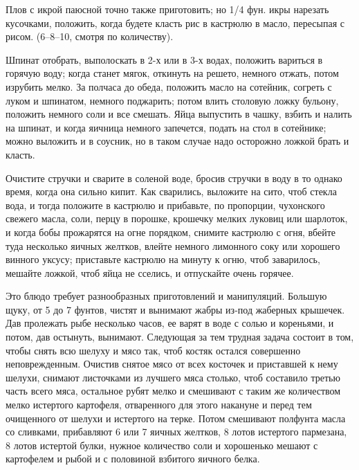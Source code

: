 Плов с икрой паюсной точно также приготовить; но 1/4 фун. икры нарезать кусочками, положить, когда будете класть рис в кастрюлю в масло, пересыпая с рисом. (6--8--10, смотря по количеству). 


Шпинат отобрать, выполоскать в 2-х или в 3-х водах, положить вариться в горячую воду; когда станет мягок, откинуть на решето, немного отжать, потом изрубить мелко. За полчаса до обеда, положить масло на сотейник, согреть с луком и шпинатом, немного поджарить; потом влить столовую ложку бульону, положить немного соли и все смешать. Яйца выпустить в чашку, взбить и налить на шпинат, и когда яичница немного запечется, подать на стол в сотейнике; можно выложить и в соусник, но в таком случае надо осторожно ложкой брать и класть. 


Очистите стручки и сварите в соленой воде, бросив стручки в воду в то однако время, когда она сильно кипит. Как сварились, выложите на сито, чтоб стекла вода, и тогда положите в кастрюлю и прибавьте, по пропорции, чухонского свежего масла, соли, перцу в порошке, крошечку мелких луковиц или шарлоток, и когда бобы прожарятся на огне порядком, снимите кастрюлю с огня, вбейте туда несколько яичных желтков, влейте немного лимонного соку или хорошего винного уксусу; приставьте кастрюлю на минуту к огню, чтоб заварилось, мешайте ложкой, чтоб яйца не сселись, и отпускайте очень горячее. 


Это блюдо требует разнообразных приготовлений и манипуляций. Большую щуку, от 5 до 7 фунтов, чистят и вынимают жабры из-под жаберных крышечек. Дав пролежать рыбе несколько часов, ее варят в воде с солью и кореньями, и потом, дав остынуть, вынимают. Следующая за тем трудная задача состоит в том, чтобы снять всю шелуху и мясо так, чтоб костяк остался совершенно неповрежденным. Очистив снятое мясо от всех косточек и приставшей к нему шелухи, снимают листочками из лучшего мяса столько, чтоб составило третью часть всего мяса, остальное рубят мелко и смешивают с таким же количеством мелко истертого картофеля, отваренного для этого накануне и перед тем очищенного от шелухи и истертого на терке. Потом смешивают полфунта масла со сливками, прибавляют 6 или 7 яичных желтков, 8 лотов истертого пармезана, 8 лотов истертой булки, нужное количество соли и хорошенько мешают с картофелем и рыбой и с половиной взбитого яичного белка. 

